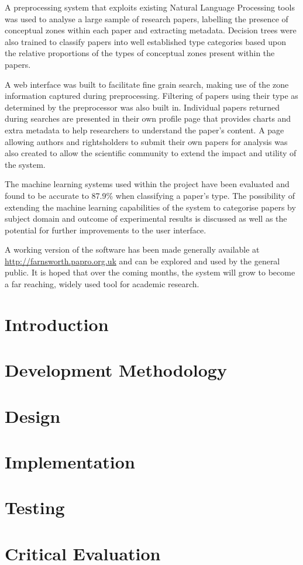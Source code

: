 \documentclass[11pt,a4paper,oneside]{book}
\begin{document}
A preprocessing system that exploits existing Natural Language Processing tools
was used to analyse a large sample of research papers, labelling the presence
of conceptual zones within each paper and extracting metadata.  Decision trees
were also trained to classify papers into well established type categories
based upon the relative proportions of the types of conceptual zones
present within the papers. 

A web interface was built to facilitate fine grain search, making use of the
zone information captured during preprocessing. Filtering of papers using their
type as determined by the preprocessor was also built in. Individual papers
returned during searches are presented in their own profile page that provides
charts and extra metadata to help researchers to understand the paper's
content. A page allowing authors and rightsholders to submit their own papers
for analysis was also created to allow the scientific community to extend the
impact and utility of the system.

The machine learning systems used within the project have been evaluated and
found to be accurate to 87.9\% when classifying a paper's type. The possibility
of extending the machine learning capabilities of the system to categorise
papers by subject domain and outcome of experimental results is discussed as
well as the potential for further improvements to the user interface.

A working version of the software has been made generally available at
\url{http://farnsworth.papro.org.uk} and can be explored and used by the
general public. It is hoped that over the coming months, the system will grow
to become a far reaching, widely used tool for academic research.


\tableofcontents

\pagebreak

\mainmatter

\chapter{Introduction}


\chapter{ Development Methodology }


\chapter{Design}


\chapter{Implementation}


\chapter{Testing}
\label{chapter:testing}


\chapter{Critical Evaluation}


\pagebreak



\appendix

\end{document}
